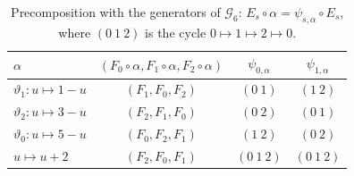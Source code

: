 \begin{table}[ht]
\centering\small
\begin{tabular}{@{}lccc@{}}
\toprule
$\alpha$ & $(F_0\circ\alpha,F_1\circ\alpha,F_2\circ\alpha)$ & $\psi_{0,\alpha}$ & $\psi_{1,\alpha}$\\
\midrule
$\vartheta_1\colon u\mapsto1-u$ & $(F_1,F_0,F_2)$ & $(0\ 1)$ & $(1\ 2)$\\
$\vartheta_2\colon u\mapsto3-u$ & $(F_2,F_1,F_0)$ & $(0\ 2)$ & $(0\ 1)$\\
$\vartheta_0\colon u\mapsto5-u$ & $(F_0,F_2,F_1)$ & $(1\ 2)$ & $(0\ 2)$\\
$u\mapsto u+2$ & $(F_2,F_0,F_1)$ & $(0\ 1\ 2)$ & $(0\ 1\ 2)$\\
\bottomrule
\end{tabular}
\caption{Precomposition with the generators of $\mathcal G_6$:
$E_s\circ\alpha=\psi_{s,\alpha}\circ E_s$, where $(0\ 1\ 2)$ is the cycle
$0\mapsto1\mapsto2\mapsto0$.}
\label{tab:reflection}
\end{table}

